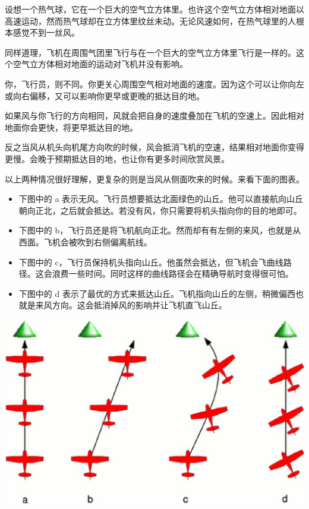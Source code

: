 设想一个热气球，它在一个巨大的空气立方体里。也许这个空气立方体相对地面以高速运动，然而热气球却在立方体里纹丝未动。无论风速如何，在热气球里的人根本感觉不到一丝风。

同样道理，飞机在周围气团里飞行与在一个巨大的空气立方体里飞行是一样的。这个空气立方体相对地面的运动对飞机并没有影响。

你，飞行员，则不同。你更关心周围空气相对地面的速度。因为这个可以让你向左或向右偏移，又可以影响你更早或更晚的抵达目的地。

如果风与你飞行的方向相同，风就会把自身的速度叠加在飞机的空速上。因此相对地面你会更快，将更早抵达目的地。

反之当风从机头向机尾方向吹的时候，风会抵消飞机的空速，结果相对地面你变得更慢。会晚于预期抵达目的地，也让你有更多时间欣赏风景。

以上两种情况很好理解，更复杂的则是当风从侧面吹来的时候。来看下面的图表。

\begin{itemize}
    \item 下图中的 a 表示无风。飞行员想要抵达北面绿色的山丘。他可以直接航向山丘朝向正北，之后就会抵达。若没有风，你只需要将机头指向你的目的地即可。
    \item 下图中的 b，飞行员还是将飞机航向正北。然而却有有左侧的来风，也就是从西面。飞机会被吹到右侧偏离航线。
    \item 下图中的 c，飞行员保持机头指向山丘。他虽然会抵达，但飞机会飞曲线路径。这会浪费一些时间。同时这样的曲线路径会在精确导航时变得很可怕。
    \item 下图中的 d 表示了最优的方式来抵达山丘。飞机指向山丘的左侧，稍微偏西也就是来风方向。这会抵消掉风的影响并让飞机直飞山丘。
\end{itemize}

\begin{center}
\includegraphics[width=1.0\textwidth]{img/tut_44}
\end{center}


